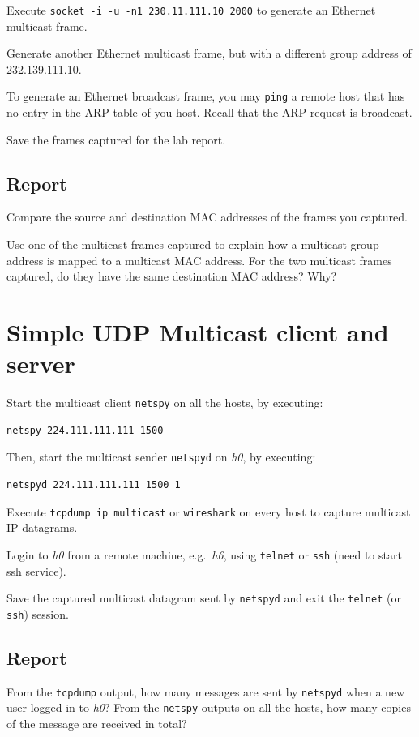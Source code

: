 \documentclass{../UTNetLab}
\begin{document}
    Execute \lstinline{socket -i -u -n1 230.11.111.10 2000} to generate an Ethernet multicast frame.

    Generate another Ethernet multicast frame, but with a different group address of {232.139.111.10}.

    To generate an Ethernet broadcast frame, you may \lstinline{ping} a remote host that has no entry in the ARP table of you host.
    Recall that the ARP request is broadcast.

    Save the frames captured for the lab report.

    \subsection*{Report}
    Compare the source and destination MAC addresses of the frames you captured.

    Use one of the multicast frames captured to explain how a multicast group address is mapped to a multicast MAC address.
    For the two multicast frames captured, do they have the same destination MAC address?
    Why?

\section{Simple UDP Multicast client and server}
    Start the multicast client \lstinline{netspy} on all the hosts, by executing:
    \begin{lstlisting}
netspy 224.111.111.111 1500
    \end{lstlisting}
    Then, start the multicast sender \lstinline{netspyd} on \textit{h0}, by executing:
    \begin{lstlisting}
netspyd 224.111.111.111 1500 1
    \end{lstlisting}
    Execute \lstinline{tcpdump ip multicast} or \lstinline{wireshark} on every host to capture multicast IP datagrams.

    Login to \textit{h0} from a remote machine, e.g.\ \textit{h6}, using \lstinline{telnet} or \lstinline{ssh} (need to start ssh service).

    Save the captured multicast datagram sent by \lstinline{netspyd} and exit the \lstinline{telnet} (or \lstinline{ssh}) session.

    \subsection*{Report}
    From the \lstinline{tcpdump} output, how many messages are sent by \lstinline{netspyd} when a new user logged in to \textit{h0}?
    From the \lstinline{netspy} outputs on all the hosts, how many copies of the message are received in total?
\end{document}
